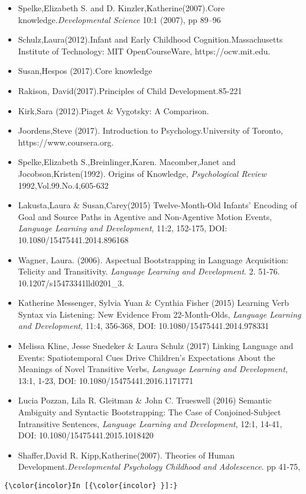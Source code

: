 \documentclass[11pt]{article}
\providecommand{\tightlist}{%
      \setlength{\itemsep}{0pt}\setlength{\parskip}{0pt}}
\begin{document}
\begin{itemize}
\tightlist
\item
  Spelke,Elizabeth S. and D. Kinzler,Katherine(2007).Core
  knowledge.\emph{Developmental Science} 10:1 (2007), pp 89--96
\item
  Schulz,Laura(2012).Infant and Early Childhood Cognition.Massachusetts
  Institute of Technology: MIT OpenCourseWare, https://ocw.mit.edu.
\item
  Susan,Hespos (2017).Core knowledge
\item
  Rakison, David(2017).Principles of Child Development.85-221
\item
  Kirk,Sara (2012).Piaget \& Vygotsky: A Comparison.
\item
  Joordens,Steve (2017). Introduction to Psychology.University of
  Toronto, https://www.coursera.org.
\item
  Spelke,Elizabeth S.,Breinlinger,Karen. Macomber,Janet and
  Jocobson,Kristen(1992). Origins of Knowledge, \emph{Psychological
  Review} 1992,Vol.99.No.4,605-632
\item
  Lakusta,Laura \& Susan,Carey(2015) Twelve-Month-Old Infants' Encoding
  of Goal and Source Paths in Agentive and Non-Agentive Motion Events,
  \emph{Language Learning and Development}, 11:2, 152-175, DOI:
  10.1080/15475441.2014.896168
\item
  Wagner, Laura. (2006). Aspectual Bootstrapping in Language
  Acquisition: Telicity and Transitivity. \emph{Language Learning and
  Development}. 2. 51-76. 10.1207/s15473341lld0201\_3.
\item
  Katherine Messenger, Sylvia Yuan \& Cynthia Fisher (2015) Learning
  Verb Syntax via Listening: New Evidence From 22-Month-Olds,
  \emph{Language Learning and Development}, 11:4, 356-368, DOI:
  10.1080/15475441.2014.978331
\item
  Melissa Kline, Jesse Snedeker \& Laura Schulz (2017) Linking Language
  and Events: Spatiotemporal Cues Drive Children's Expectations About
  the Meanings of Novel Transitive Verbs, \emph{Language Learning and
  Development}, 13:1, 1-23, DOI: 10.1080/15475441.2016.1171771
\item
  Lucia Pozzan, Lila R. Gleitman \& John C. Trueswell (2016) Semantic
  Ambiguity and Syntactic Bootstrapping: The Case of Conjoined-Subject
  Intransitive Sentences, \emph{Language Learning and Development},
  12:1, 14-41, DOI: 10.1080/15475441.2015.1018420
\item
  Shaffer,David R. Kipp,Katherine(2007). Theories of Human
  Development.\emph{Developmental Psychology Childhood and Adolescence}.
  pp 41-75,
\end{itemize}

    \begin{Verbatim}[commandchars=\\\{\}]
{\color{incolor}In [{\color{incolor} }]:} 
\end{Verbatim}


    
    
    
    
\end{document}
